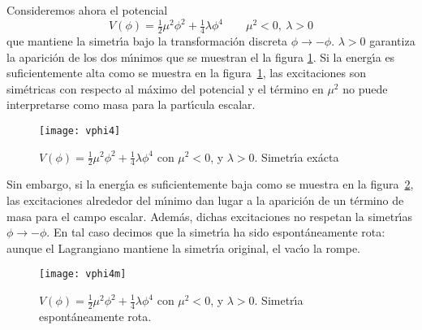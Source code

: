 Consideremos ahora el potencial
\begin{equation}
  V(\phi)=\tfrac{1}{2}\mu^2\phi^2+\tfrac{1}{4}\lambda\phi^4
  \qquad   \mu^2\lt 0,\ \lambda\gt 0
\end{equation}
que mantiene la simetr\'\i a bajo la transformaci\'on discreta $\phi\to-\phi$. $\lambda\gt 0$ garantiza la aparici\'on de los dos m\'\i nimos que se muestran el la figura \ref{fig:x2l}. Si la energ\'\i a es suficientemente alta como se muestra en la figura~\ref{fig:x2l}, las excitaciones son sim\'etricas con respecto al m\'aximo del potencial y el t\'ermino en $\mu^2$ no puede interpretarse como masa para la part\'\i cula escalar. 

\begin{figure} %
  \centering %
  \texttt{[image: vphi4]}
  \caption{$V(\phi)=\frac{1}{2}\mu^2 \phi^2+\frac{1}{4}\lambda\phi^4$ con $\mu^2\lt 0$, y $\lambda\gt 0$. Simetr\'\i a ex\'acta} %
  \label{fig:x2l} %
\end{figure} %
Sin embargo, si la energ\'\i a es suficientemente baja como se muestra en la figura~\ref{fig:x2lm}, las excitaciones alrededor del m\'\i nimo dan lugar a la aparici\'on de un t\'ermino de masa para el campo escalar. Adem\'as, dichas excitaciones no respetan la simetr\'\i as $\phi\to-\phi$. En tal caso decimos que la simetr\'\i a ha sido espont\'aneamente rota: aunque el Lagrangiano mantiene la simetr\'\i a original, el vac\'\i o la rompe. 

\begin{figure} %
  \centering %
  \texttt{[image: vphi4m]}
  \caption{$V(\phi)=\frac{1}{2}\mu^2 \phi^2+\frac{1}{4}\lambda\phi^4$ con $\mu^2\lt 0$, y $\lambda\gt 0$. Simetr\'\i a espont\'aneamente rota.} %
  \label{fig:x2lm} %
\end{figure}  %

